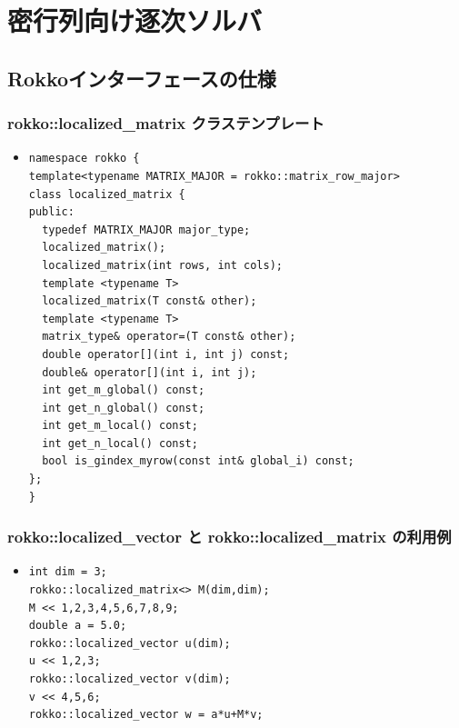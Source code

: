 \section{密行列向け逐次ソルバ}

\subsection{Rokkoインターフェースの仕様}

\begin{frame}[c,fragile]
  \frametitle{rokko::localized\_matrix クラステンプレート}
  \begin{itemize}
  \item {}
\begin{lstlisting}
namespace rokko {
template<typename MATRIX_MAJOR = rokko::matrix_row_major>
class localized_matrix {
public:
  typedef MATRIX_MAJOR major_type;
  localized_matrix();
  localized_matrix(int rows, int cols);
  template <typename T>
  localized_matrix(T const& other);
  template <typename T>
  matrix_type& operator=(T const& other);
  double operator[](int i, int j) const;
  double& operator[](int i, int j);
  int get_m_global() const;
  int get_n_global() const;
  int get_m_local() const;
  int get_n_local() const;
  bool is_gindex_myrow(const int& global_i) const;
};
}
\end{lstlisting}
  \end{itemize}
\end{frame}

\begin{frame}[c,fragile]
  \frametitle{rokko::localized\_vector と rokko::localized\_matrix の利用例}
  \begin{itemize}
  \item {}
\begin{lstlisting}
int dim = 3;
rokko::localized_matrix<> M(dim,dim);
M << 1,2,3,4,5,6,7,8,9;
double a = 5.0;
rokko::localized_vector u(dim);
u << 1,2,3;
rokko::localized_vector v(dim);
v << 4,5,6;
rokko::localized_vector w = a*u+M*v;
\end{lstlisting}
  \end{itemize}
\end{frame}


